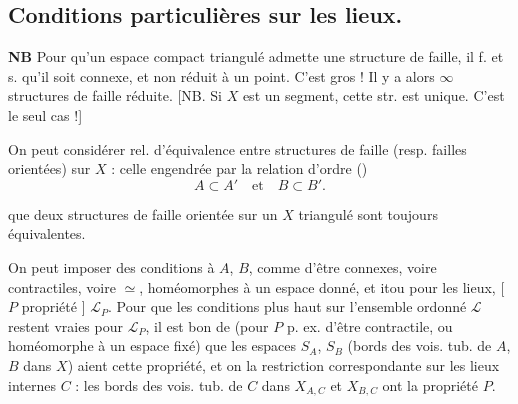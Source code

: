 \documentclass[11pt,a4paper]{article}
\begin{document}
\subsection{Conditions particulières sur les lieux.}

\textbf{NB} Pour qu'un espace compact triangulé admette une structure de faille, il f. et s. qu'il soit connexe, et non réduit à un point. C'est gros ! Il y a alors $\infty$  structures de faille réduite. [NB. Si $X$ est un segment, \ill{} cette str. est unique. C'est le seul cas \ill{} !]

On peut considérer rel. d'équivalence entre structures de faille  (resp. failles orientées) sur $X$ : \ill{} celle engendrée par la relation d'ordre ()  \struck{\ill{}}
\[
  A \subset A' \quad \text{et} \quad B \subset B' .
\]
\struck{[\textbf{NB} Si $(X, \{A,B\})$ est une faille, $A'$, $B'$ sont des fermés, et si \uncertain{$A'$, $B'$} régulièrement immergés tels que $A \subset A'$, $B \subset B'$, $A' \cap B' = \emptyset$, alors $(X, \{A',B'\})$ est une faille.]}

\struck{\ill{}} \ill{} que deux structures de faille orientée sur un $X$ triangulé sont toujours équivalentes.

 On peut imposer des conditions à $A$, $B$, comme d'être connexes, voire contractiles, voire $\simeq$, homéomorphes à un espace donné, et itou pour les lieux,  [\ill{} $P$ propriété ] \ill{} \struck{\ill{}} $\mathcal{L}_P$. Pour que les conditions plus haut sur l'ensemble ordonné $\mathcal{L}$  restent vraies pour $\mathcal{L}_P$, il est bon de \struck{\ill{}} (pour $P$  p. ex.  \ill{} d'être contractile, ou homéomorphe à un espace fixé) que les espaces $S_A$, $S_B$ (bords des vois. tub. de $A$, $B$ dans $X$) aient cette propriété, et  on  la restriction correspondante sur les lieux internes $C$ : les bords des vois. tub. de $C$ dans $X_{A,C}$ et $X_{B,C}$ ont la propriété $P$.
\end{document}
